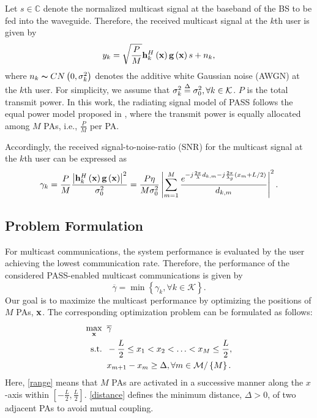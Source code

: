 \documentclass[summary]{ursi}
\begin{document}
Let $s \in \mathbb{C}$ denote the normalized multicast signal at the baseband of the BS to be fed into the waveguide. Therefore, the received multicast signal at the $k$th user is given by
\begin{equation}
  \label{yk}
{y_k} = \sqrt {\frac{P}{M}} {{\bf{h}}_k^H}\left( {\bf{x}} \right){\bf{g}}\left( {\bf{x}} \right)s + {n_k},
\end{equation}
where ${n_k}\thicksim CN\left( {0,\sigma _k^2} \right)$ denotes the additive white Gaussian noise (AWGN) at the $k$th user. For simplicity, we assume that $\sigma _k^2 \buildrel \Delta \over = \sigma _0^2,\forall k \in {\mathcal K}$. $P$ is the total transmit power. In this work, the radiating signal model of PASS follows the equal power model proposed in \cite{PASS}, where the transmit power is equally allocated among $M$ PAs, i.e., ${\frac{P}{M}}$ per PA.

Accordingly, the received signal-to-noise-ratio (SNR) for the multicast signal at the $k$th user can be expressed as
\begin{equation}
  \label{SNR}
{\gamma _k} = \frac{P}{M}\frac{{{{\left| {{{\bf{h}}_k^H}\left( {\bf{x}} \right){\bf{g}}\left( {\bf{x}} \right)} \right|}^2}}}{{\sigma _0^2}} = \frac{{P\eta }}{{M\sigma _0^2}}\left| {\sum\limits_{m = 1}^M {\frac{{{e^{ - j\frac{{2\pi }}{\lambda }{d_{k,m}} - j\frac{{2\pi }}{{{\lambda _g}}}\left( {{x_m} + {L \mathord{\left/
 {\vphantom {L 2}} \right.
 \kern-\nulldelimiterspace} 2}} \right)}}}}{{{d_{k,m}}}}} } \right|^2.
\end{equation}

\subsection{Problem Formulation}
For multicast communications, the system performance is evaluated by the user achieving the lowest communication rate. Therefore, the performance of the considered PASS-enabled multicast communications is given by
\begin{equation}
  \label{MC_performance}
\overline \gamma   = \min \left\{ {{\gamma _k},\forall k \in {\mathcal K}} \right\}.
\end{equation}
Our goal is to maximize the multicast performance by optimizing the positions of $M$ PAs, ${\bf{x}}$. The corresponding optimization problem can be formulated as follows:
\begin{subequations}\label{problem}
\begin{align}
\mathop {\max }\limits_{\bf{x}} \;\;&\overline \gamma  \\
\label{range}{\rm{s.t.}}\;\;& - \frac{L}{2} \le {x_1} < {x_2} <  \ldots  < {x_M} \le \frac{L}{2},\\
\label{distance} & {x_{m + 1}} - {x_m} \ge \Delta ,\forall m \in {\mathcal M}/\left\{ M \right\}.
\end{align}
\end{subequations}
Here, \eqref{range} means that $M$ PAs are activated in a successive manner along the $x$-axis within $\left[ { - \frac{L}{2},\frac{L}{2}} \right]$. \eqref{distance} defines the minimum distance, $\Delta> 0$, of two adjacent PAs to avoid mutual coupling.
\end{document}
